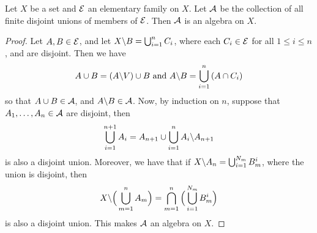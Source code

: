 \begin{lemma}\label{lemma_1.1.9}
    Let $X$ be a set and $\mathcal{E}$ an elementary family on  $X$. Let $\mathcal{A}$ be the
    collection of all finite disjoint unions of members of $\mathcal{E}$. Then $\mathcal{A}$ is
    an algebra on $X$.
\end{lemma}
\begin{proof}
    Let $A,B \in \mathcal{E}$, and let $X \backslash B=\bigcup_{i=1}^n{C_i}$, where each
    $C_i \in \mathcal{E}$ for all $1 \leq i \leq n$, and are disjoint. Then we have
    \begin{equation*}
        A \cup B=(A \backslash V) \cup B \text{ and }
        A \backslash B=\bigcup_{i=1}^n{(A \cap C_i)}
    \end{equation*}
    so that $A \cup B \in \mathcal{A}$, and $A \backslash B \in \mathcal{A}$. Now, by induction on
    $n$, suppose that $A_1, \dots, A_n \in \mathcal{A}$ are disjoint, then
    \begin{equation*}
        \bigcup_{i=1}^{n+1}{A_i}=A_{n+1} \cup \bigcup_{i=1}^n{A_i \backslash A_{n+1}}
    \end{equation*}
    is also a disjoint union. Moreover, we have that if
    $X \backslash A_n=\bigcup_{i=1}^{N_m}{B_m^i}$, where the union is disjoint, then
    \begin{equation*}
        X \backslash \Big{(} \bigcup_{m=1}^n{A_m} \Big{)}=
        \bigcap_{m=1}^n{\Big{(} \bigcup_{i=1}^{N_m}{B_m^i} \Big{)}}
    \end{equation*}
    is also a disjoint union. This makes $\mathcal{A}$ an algebra on $X$.
\end{proof}
